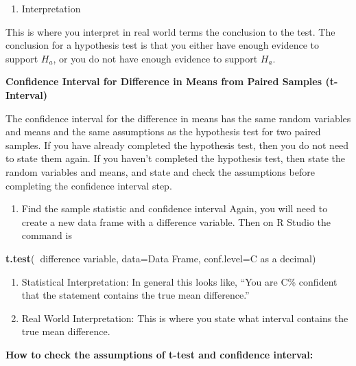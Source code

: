 \documentclass[
]{book}
\newenvironment{Shaded}{\begin{snugshade}}{\end{snugshade}}
\newcommand{\DataTypeTok}[1]{\textcolor[rgb]{0.13,0.29,0.53}{#1}}
\newcommand{\KeywordTok}[1]{\textcolor[rgb]{0.13,0.29,0.53}{\textbf{#1}}}
\newcommand{\NormalTok}[1]{#1}
\newcommand{\OperatorTok}[1]{\textcolor[rgb]{0.81,0.36,0.00}{\textbf{#1}}}
\providecommand{\tightlist}{%
  \setlength{\itemsep}{0pt}\setlength{\parskip}{0pt}}
\begin{document}
\begin{enumerate}
\def\labelenumi{\arabic{enumi}.}
\setcounter{enumi}{5}
\tightlist
\item
  Interpretation
\end{enumerate}

This is where you interpret in real world terms the conclusion to the test. The conclusion for a hypothesis test is that you either have enough evidence to support \(H_a\), or you do not have enough evidence to support \(H_a\).

\textbf{Confidence Interval for Difference in Means from Paired Samples (t-Interval)}

The confidence interval for the difference in means has the same random variables and means and the same assumptions as the hypothesis test for two paired samples. If you have already completed the hypothesis test, then you do not need to state them again. If you haven't completed the hypothesis test, then state the random variables and means, and state and check the assumptions before completing the confidence interval step.

\begin{enumerate}
\def\labelenumi{\arabic{enumi}.}
\tightlist
\item
  Find the sample statistic and confidence interval
  Again, you will need to create a new data frame with a difference variable. Then on R Studio the command is
\end{enumerate}

\begin{Shaded}
\begin{Highlighting}[]
\KeywordTok{t.test}\NormalTok{(}\OperatorTok{~}\NormalTok{difference variable, }\DataTypeTok{data=}\NormalTok{Data Frame, }\DataTypeTok{conf.level=}\NormalTok{C as a decimal)}
\end{Highlighting}
\end{Shaded}

\begin{enumerate}
\def\labelenumi{\arabic{enumi}.}
\setcounter{enumi}{1}
\item
  Statistical Interpretation: In general this looks like, ``You are C\% confident that the statement contains the true mean difference.''
\item
  Real World Interpretation: This is where you state what interval contains the true mean difference.
\end{enumerate}

\textbf{How to check the assumptions of t-test and confidence interval:}
\end{document}
